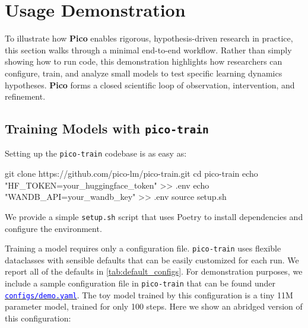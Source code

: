 \section{Usage Demonstration} 
\label{sec:usage-demonstration}

To illustrate how \textbf{Pico} enables rigorous, hypothesis-driven research in practice, this section walks through a minimal end-to-end workflow. Rather than simply showing how to run code, this demonstration highlights how researchers can configure, train, and analyze small models to test specific learning dynamics hypotheses. \textbf{Pico} forms a closed scientific loop of observation, intervention, and refinement.

\subsection{Training Models with \texttt{pico-train}}

Setting up the \texttt{pico-train} codebase is as easy as:

\begin{center}
    \begin{codelisting}
        git clone https://github.com/pico-lm/pico-train.git
        cd pico-train
        echo "HF_TOKEN=your_huggingface_token" >> .env
        echo "WANDB_API=your_wandb_key" >> .env
        source setup.sh
    \end{codelisting}
\end{center}

We provide a simple \verb|setup.sh| script that uses Poetry \citep{poetry} to install dependencies and configure the environment.

Training a model requires only a configuration file. \texttt{pico-train} uses flexible dataclasses with sensible defaults that can be easily customized for each run. We report all of the defaults in \cref{tab:default_configs}. For demonstration purposes, we include a sample configuration file in \texttt{pico-train} that can be found under \href{https://github.com/pico-lm/pico-train/blob/main/configs/demo.yaml}{\textcolor{blue}{\texttt{configs/demo.yaml}}}. The toy model trained by this configuration is a tiny 11M parameter model, trained for only 100 steps. Here we show an abridged version of this configuration:


